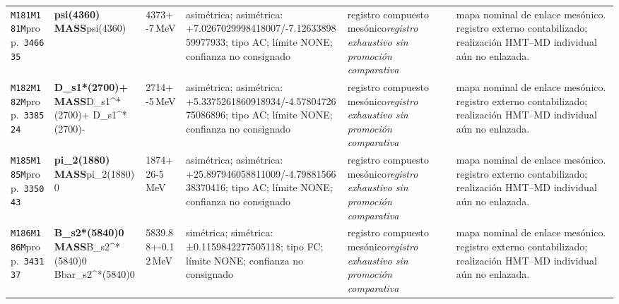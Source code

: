 \begin{landscape}
\begin{longtable}{L{1.85cm}L{4.45cm}L{2.35cm}L{4.05cm}L{3.35cm}L{7.15cm}}
\texttt{M181}\newline \texttt{M181M}\newline prop.\ \texttt{346635} & \textbf{psi(4360) MASS}\newline psi(4360) & 4373+-7\,MeV & asimétrica; asimétrica: +7.0267029998418007/-7.1263389859977933; tipo AC; límite NONE; confianza no consignado & registro compuesto mesónico\newline \emph{registro exhaustivo sin promoción comparativa} & mapa nominal de enlace mesónico. registro externo contabilizado; realización HMT--MD individual aún no enlazada. \\
\texttt{M182}\newline \texttt{M182M}\newline prop.\ \texttt{338524} & \textbf{D\_\allowbreak{}s1*(2700)+ MASS}\newline D\_\allowbreak{}s1\textasciicircum{}*(2700)+ \textbar{}\allowbreak{} D\_\allowbreak{}s1\textasciicircum{}*(2700)- & 2714+-5\,MeV & asimétrica; asimétrica: +5.3375261860918934/-4.5780472675086896; tipo AC; límite NONE; confianza no consignado & registro compuesto mesónico\newline \emph{registro exhaustivo sin promoción comparativa} & mapa nominal de enlace mesónico. registro externo contabilizado; realización HMT--MD individual aún no enlazada. \\
\texttt{M185}\newline \texttt{M185M}\newline prop.\ \texttt{335043} & \textbf{pi\_\allowbreak{}2(1880) MASS}\newline pi\_\allowbreak{}2(1880)0 & 1874+26-5\,MeV & asimétrica; asimétrica: +25.897946058811009/-4.7988156638370416; tipo AC; límite NONE; confianza no consignado & registro compuesto mesónico\newline \emph{registro exhaustivo sin promoción comparativa} & mapa nominal de enlace mesónico. registro externo contabilizado; realización HMT--MD individual aún no enlazada. \\
\texttt{M186}\newline \texttt{M186M}\newline prop.\ \texttt{343137} & \textbf{B\_\allowbreak{}s2*(5840)0 MASS}\newline B\_\allowbreak{}s2\textasciicircum{}*(5840)0 \textbar{}\allowbreak{} Bbar\_\allowbreak{}s2\textasciicircum{}*(5840)0 & 5839.88+-0.12\,MeV & simétrica; simétrica: ±0.1159842277505118; tipo FC; límite NONE; confianza no consignado & registro compuesto mesónico\newline \emph{registro exhaustivo sin promoción comparativa} & mapa nominal de enlace mesónico. registro externo contabilizado; realización HMT--MD individual aún no enlazada. \\

\end{longtable}
\end{landscape}

